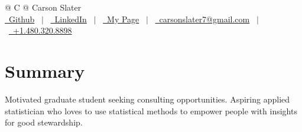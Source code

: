 \documentclass[a4paper,12pt]{article}
\begin{document}
\pagestyle{empty} 



\begin{tabularx}{\linewidth}{@{} C @{}}
\Huge{Carson Slater} \\[7.5pt]
\href{https://github.com/carsonslater}{\raisebox{-0.05\height}\faGithub\ Github} \ $|$ \ 
\href{https://www.linkedin.com/in/carsonslateratbaylor/}{\raisebox{-0.05\height}\faLinkedin\ LinkedIn} \ $|$ \ 
\href{https://carsonslater.com}{\raisebox{-0.05\height}\faGlobe \ My Page} \ $|$ \ 
\href{mailto:carsonslater7@gmail.com}{\raisebox{-0.05\height}\faEnvelope \ carsonslater7@gmail.com} \ $|$ \ 
\href{tel:+14803208898}{\raisebox{-0.05\height}\faMobile \ +1.480.320.8898} \\
\end{tabularx}


\section{Summary}
Motivated graduate student seeking consulting opportunities. Aspiring applied statistician who loves to use statistical methods to empower people with insights for good stewardship.


\end{document}
